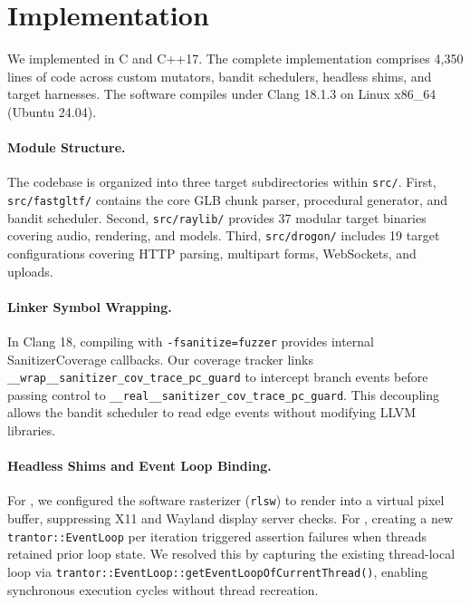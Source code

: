 \section{Implementation}
\label{sec:impl}

We implemented \tool in C and C++17.
The complete implementation comprises 4{,}350 lines of code across custom mutators, bandit schedulers, headless shims, and target harnesses.
The software compiles under Clang 18.1.3 on Linux x86\_64 (Ubuntu 24.04).

\paragraph{Module Structure.}
The codebase is organized into three target subdirectories within \texttt{src/}.
First, \texttt{src/fastgltf/} contains the core GLB chunk parser, procedural generator, and bandit scheduler.
Second, \texttt{src/raylib/} provides 37 modular target binaries covering audio, rendering, and models.
Third, \texttt{src/drogon/} includes 19 target configurations covering HTTP parsing, multipart forms, WebSockets, and uploads.

\paragraph{Linker Symbol Wrapping.}
In Clang 18, compiling with \texttt{-fsanitize=fuzzer} provides internal SanitizerCoverage callbacks.
Our coverage tracker links \texttt{\_\_wrap\_\_sanitizer\_cov\_trace\_pc\_guard} to intercept branch events before passing control to \texttt{\_\_real\_\_sanitizer\_cov\_trace\_pc\_guard}.
This decoupling allows the bandit scheduler to read edge events without modifying LLVM libraries.

\paragraph{Headless Shims and Event Loop Binding.}
For \raylib, we configured the software rasterizer (\texttt{rlsw}) to render into a virtual pixel buffer, suppressing X11 and Wayland display server checks.
For \drogon, creating a new \texttt{trantor::EventLoop} per iteration triggered assertion failures when threads retained prior loop state.
We resolved this by capturing the existing thread-local loop via \texttt{trantor::EventLoop::getEventLoopOfCurrentThread()}, enabling synchronous execution cycles without thread recreation.
